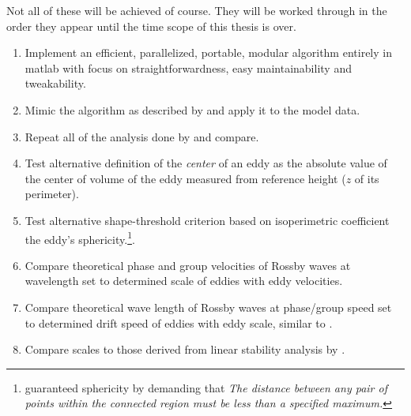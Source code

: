 
\label{sec:goals}



Not all of these will be achieved of course. They will be worked through in the order they appear until the time scope of this thesis is over.
{\bfseries
\begin{enumerate}

\item
Implement an efficient, parallelized, portable, modular algorithm entirely in matlab with focus on straightforwardness, easy maintainability and tweakability.

\item
Mimic the algorithm as described by \cite{Chelton2011} and apply it to the model data.

\item
Repeat all of the analysis done by \cite{Chelton2011} and compare.

\item
Test alternative definition of the \textit{center} of an eddy as the absolute value of the center of volume of the eddy measured from reference height ($z$ of its perimeter).

\item
Test alternative shape-threshold criterion based on isoperimetric coefficient \ie the eddy's sphericity.\footnote{\cite{Chelton2011} guaranteed sphericity by demanding that \textit{The distance between any pair of points within the connected region must be less than a specified maximum.}}.

\item
Compare theoretical phase and group velocities of Rossby waves at wavelength set to determined scale of eddies with eddy velocities.

\item
Compare theoretical wave length of Rossby waves at phase/group speed set to determined drift speed of eddies with eddy scale, similar to \citep{Tulloch2009}.

\item
Compare scales to those derived from linear stability analysis by \eg \cite{Vollmer2013a,eden2012implementing,Smith2009,griesel2013eulerian}.
\end{enumerate}
}

